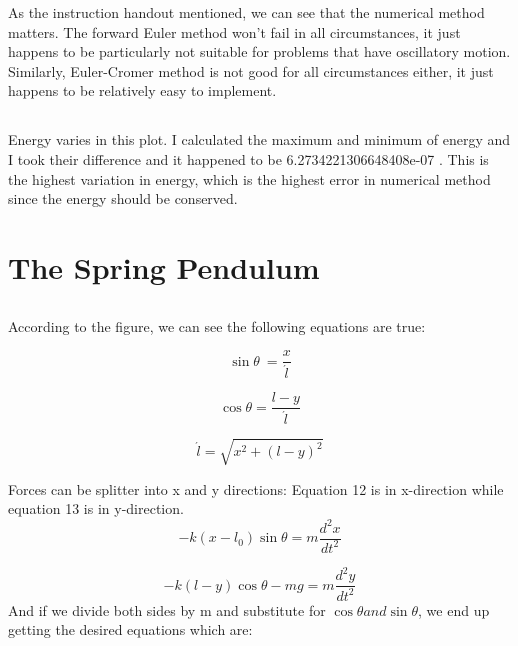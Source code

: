 \documentclass[letterpaper,12pt]{article}
\begin{document}
As the instruction handout mentioned, we can see that the numerical method matters. The forward Euler method won't fail in all circumstances, it just happens to be particularly not suitable for problems that have oscillatory motion. Similarly, Euler-Cromer method is not good for all circumstances either, it just happens to be relatively easy to implement.


\subsection{}
Energy varies in this plot. I calculated the maximum and minimum of energy and I took their difference and it happened to be 6.2734221306648408e-07 . This is the highest variation in energy, which is the highest error in numerical method since the energy should be conserved.

\section{The Spring Pendulum}
\label{sec:thespringpendulum}

\subsection{}
According to the figure, we can see the following equations are true:

\begin{equation}
\sin\theta\ = \frac{x}{\acute{l}}
\end{equation}

\begin{equation}
\cos\theta = \frac{l-y}{\acute{l}}
\end{equation}

\begin{equation}
\acute{l}=\sqrt{x^2 + (l-y)^2}
\end{equation}

Forces can be splitter into x and y directions:
Equation 12 is in x-direction while equation 13 is in y-direction.
\begin{equation}
-k(x-l_{0})\sin\theta = m\frac{d^2x}{dt^2} 
\end{equation}

\begin{equation}
-k(l-y)\cos\theta-mg = m\frac{d^2y}{dt^2} 
\end{equation}
And if we divide both sides by m and substitute for \begin{math}\cos\theta and \sin\theta \end{math}, we end up getting the desired equations which are:
\end{document}
